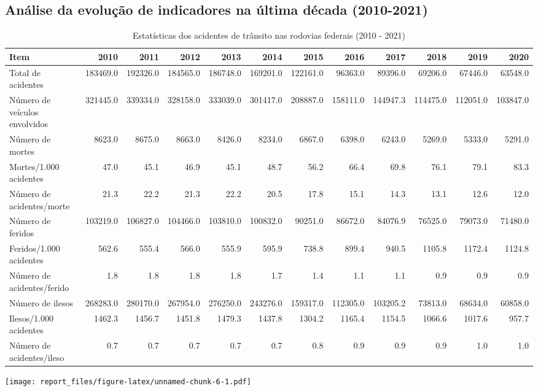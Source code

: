 \documentclass[
]{article}
\begin{document}
\hypertarget{anuxe1lise-da-evoluuxe7uxe3o-de-indicadores-na-uxfaltima-duxe9cada-2010-2021}{%
\subsection{Análise da evolução de indicadores na última década
(2010-2021)}\label{anuxe1lise-da-evoluuxe7uxe3o-de-indicadores-na-uxfaltima-duxe9cada-2010-2021}}

\begin{table}

\caption{\label{tab:unnamed-chunk-6}Estatísticas dos acidentes de trânsito nas rodovias federais (2010 - 2021)}
\centering
\fontsize{7}{9}\selectfont
\begin{tabular}[t]{l|r|r|r|r|r|r|r|r|r|r|r}
\hline
Item & 2010 & 2011 & 2012 & 2013 & 2014 & 2015 & 2016 & 2017 & 2018 & 2019 & 2020\\
\hline
Total de acidentes & 183469.0 & 192326.0 & 184565.0 & 186748.0 & 169201.0 & 122161.0 & 96363.0 & 89396.0 & 69206.0 & 67446.0 & 63548.0\\
\hline
Número de veículos envolvidos & 321445.0 & 339334.0 & 328158.0 & 333039.0 & 301417.0 & 208887.0 & 158111.0 & 144947.3 & 114475.0 & 112051.0 & 103847.0\\
\hline
Número de mortes & 8623.0 & 8675.0 & 8663.0 & 8426.0 & 8234.0 & 6867.0 & 6398.0 & 6243.0 & 5269.0 & 5333.0 & 5291.0\\
\hline
Mortes/1.000 acidentes & 47.0 & 45.1 & 46.9 & 45.1 & 48.7 & 56.2 & 66.4 & 69.8 & 76.1 & 79.1 & 83.3\\
\hline
Número de acidentes/morte & 21.3 & 22.2 & 21.3 & 22.2 & 20.5 & 17.8 & 15.1 & 14.3 & 13.1 & 12.6 & 12.0\\
\hline
Número de feridos & 103219.0 & 106827.0 & 104466.0 & 103810.0 & 100832.0 & 90251.0 & 86672.0 & 84076.9 & 76525.0 & 79073.0 & 71480.0\\
\hline
Feridos/1.000 acidentes & 562.6 & 555.4 & 566.0 & 555.9 & 595.9 & 738.8 & 899.4 & 940.5 & 1105.8 & 1172.4 & 1124.8\\
\hline
Número de acidentes/ferido & 1.8 & 1.8 & 1.8 & 1.8 & 1.7 & 1.4 & 1.1 & 1.1 & 0.9 & 0.9 & 0.9\\
\hline
Número de ilesos & 268283.0 & 280170.0 & 267954.0 & 276250.0 & 243276.0 & 159317.0 & 112305.0 & 103205.2 & 73813.0 & 68634.0 & 60858.0\\
\hline
Ilesos/1.000 acidentes & 1462.3 & 1456.7 & 1451.8 & 1479.3 & 1437.8 & 1304.2 & 1165.4 & 1154.5 & 1066.6 & 1017.6 & 957.7\\
\hline
Número de acidentes/ileso & 0.7 & 0.7 & 0.7 & 0.7 & 0.7 & 0.8 & 0.9 & 0.9 & 0.9 & 1.0 & 1.0\\
\hline
\end{tabular}
\end{table}

\texttt{[image: report\_files/figure-latex/unnamed-chunk-6-1.pdf]}

\hypertarget{section}{%
\subsection{}\label{section}}
\end{document}
